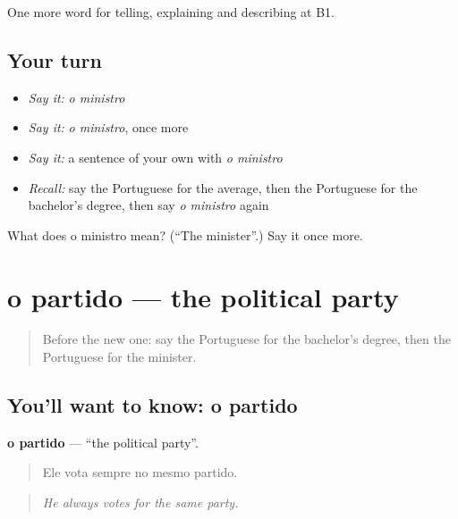\begin{grammarlens}[title={What you've built}]
One more word for telling, explaining and describing at B1.
\end{grammarlens}

\subsection*{Your turn}
\begin{itemize}
\raggedright
  \item \emph{Say it:} \emph{o ministro}
  \item \emph{Say it:} \emph{o ministro}, once more
  \item \emph{Say it:} a sentence of your own with \emph{o ministro}
  \item \emph{Recall:} say the Portuguese for the average, then the Portuguese for the bachelor's degree, then say \emph{o ministro} again
\end{itemize}

\begin{tcolorbox}[breakable,colback=teal!4,colframe=teal!35!black,title={Before you move on}]
What does o ministro mean? (\textquotedblleft{}The minister\textquotedblright{}.) Say it once more.
\end{tcolorbox}
\section[o partido]{o partido — the political party}

\label{lesson:PT-C380-partido}



\begin{quote}
Before the new one: say the Portuguese for the bachelor's degree, then the Portuguese for the minister.
\end{quote}

\subsection*{You'll want to know: o partido}
\textbf{o partido} — \textquotedblleft{}the political party\textquotedblright{}.

\begin{quote}
Ele vota sempre no mesmo partido.
\end{quote}

\begin{quote}
\emph{He always votes for the same party.}
\end{quote}

